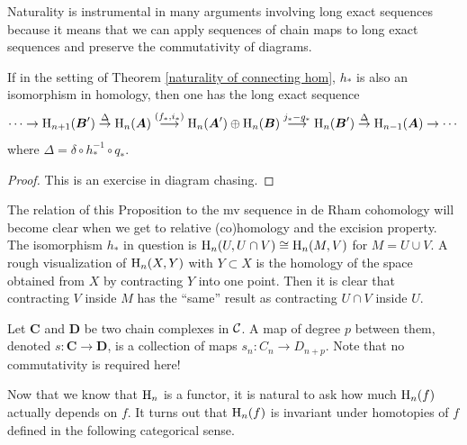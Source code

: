 Naturality is instrumental in many arguments involving long exact sequences because it means that we can apply sequences of chain maps to long exact sequences and preserve the commutativity of diagrams.

\begin{prop}\label{prop algebraic MV}
    If in the setting of Theorem \ref{naturality of connecting hom}, $h_\ast$ is also an isomorphism in homology, then one has the long exact sequence
    \[\cdots \to \mathrm{H}_{n+1}(\boldsymbol{B}')\overset\Delta\to \mathrm{H}_n(\boldsymbol{A})\overset{(f_\ast,i_\ast)}\longrightarrow \mathrm{H}_n(\boldsymbol{A}')\oplus \mathrm{H}_n(\boldsymbol{B})\overset{j_\ast- g_\ast}\longrightarrow \mathrm{H}_n(\boldsymbol{B}')\overset{\Delta}\to \mathrm{H}_{n-1}(\boldsymbol{A})\to \cdots\]
    where $\Delta=\delta \circ h_\ast^{-1}\circ q_\ast$.
\end{prop}
\begin{proof}
     This is an exercise in diagram chasing.
\end{proof}

The relation of this Proposition to the \gls{mv} sequence in de Rham cohomology will become clear when we get to relative (co)homology and the excision property. The isomorphism $h_\ast$ in question is $\mathrm{H}_n(U,U\cap V)\cong \mathrm{H}_n(M,V)$ for $M=U\cup V$. A rough visualization of $\mathrm{H}_n(X,Y)$ with $Y\subset X$ is the homology of the space obtained from $X$ by contracting $Y$ into one point. Then it is clear that contracting $V$ inside $M$ has the ``same'' result as contracting $U\cap V$ inside $U$. 


\begin{defn}
    Let $\bm{C}$ and $\bm{D}$ be two chain complexes in $\mathcal{C}$. A map of degree $p$ between them, denoted $s:\bm{C}\to \bm{D}$, is a collection of maps $s_n:C_n\to D_{n+p}$. Note that no commutativity is required here!
\end{defn}


Now that we know that $\mathrm{H}_n$ is a functor, it is natural to ask how much $\mathrm{H}_n(f)$ actually depends on $f$. It turns out that $\mathrm{H}_n(f)$ is invariant under homotopies of $f$ defined in the following categorical sense.


